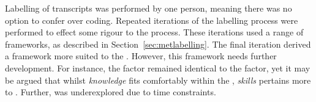 Labelling of transcripts was performed by one person, meaning there was no option to confer over coding. Repeated iterations of the labelling process were performed to effect some rigour to the process. These iterations used a range of frameworks, as described in Section~\ref{sec:metlabelling}. The final iteration derived a framework more suited to the \SPI. However, this framework needs further development. For instance, the \skiskil{} factor remained identical to the \ISM{} \ismis{} factor, yet it may be argued that whilst \emph{knowledge} fits comfortably within the \skiknow{}, \emph{skills} pertains more to \skiscip. Further, \skiemot{} was underexplored due to time constraints.

